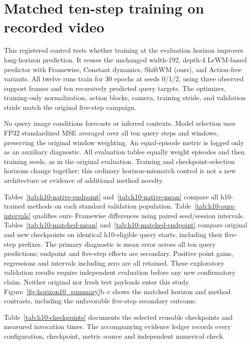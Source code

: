 \section{Matched ten-step training on recorded video}
\label{app:horizon10-development}
This registered control tests whether training at the evaluation horizon improves
long-horizon prediction. It reuses the unchanged width-192, depth-4 LeWM-based
predictor with Framewise, Constant dynamics, ShiftWM (ours), and Action-free
variants. All twelve runs train for 30 epochs at seeds 0/1/2, using three
observed support frames and ten recursively predicted query targets. The
optimizer, training-only normalization, action blocks, camera, training stride,
and validation stride match the original five-step campaign.

No query image conditions forecasts or inferred contexts. Model selection uses
FP32 standardized MSE averaged over all ten query steps and windows, preserving
the original window weighting. An equal-episode metric is logged only as an
auxiliary diagnostic. All evaluation tables equally weight episodes and then
training seeds, as in the original evaluation. Training and checkpoint-selection
horizons change together; this ordinary horizon-mismatch control is not a new
architecture or evidence of additional method novelty.

Tables~\ref{tab:h10-native-endpoint} and~\ref{tab:h10-native-mean} compare all
h10-trained methods on each standard validation population.
Table~\ref{tab:h10-ours-intervals} qualifies ours--Framewise differences using
paired seed/session intervals. Tables~\ref{tab:h10-matched-mean}
and~\ref{tab:h10-matched-endpoint} compare original and new checkpoints on
identical h10-eligible query starts, including their five-step prefixes. The
primary diagnostic is mean error across all ten query predictions; endpoint
and five-step effects are secondary. Positive point gains, regressions and
intervals including zero are all retained. These exploratory validation results
require independent evaluation before any new confirmatory claim. Neither
original nor fresh test payloads enter this study.
Figure~\ref{fig:horizon10_summary}b--c shows the matched horizon and method
contrasts, including the unfavorable five-step secondary outcome.

Table~\ref{tab:h10-checkpoints} documents the selected reusable checkpoints and
measured invocation times. The accompanying evidence ledger records every
configuration, checkpoint, metric source and independent numerical check.






